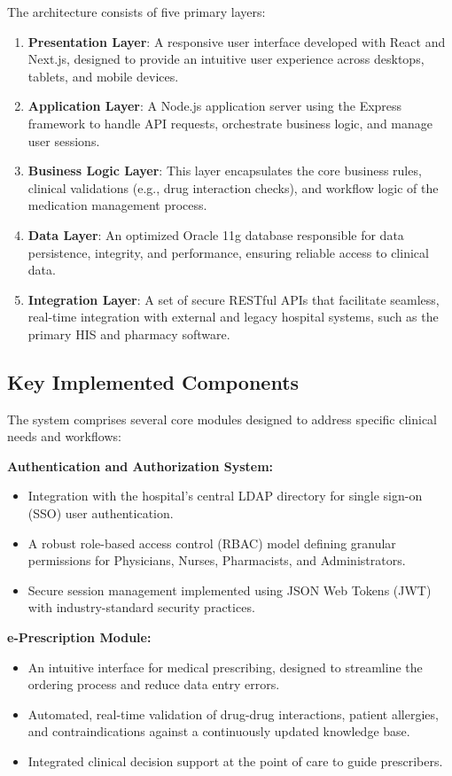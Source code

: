 The architecture consists of five primary layers:

\begin{enumerate}
    \item \textbf{Presentation Layer}: A responsive user interface developed with React and Next.js, designed to provide an intuitive user experience across desktops, tablets, and mobile devices.
    \item \textbf{Application Layer}: A Node.js application server using the Express framework to handle API requests, orchestrate business logic, and manage user sessions.
    \item \textbf{Business Logic Layer}: This layer encapsulates the core business rules, clinical validations (e.g., drug interaction checks), and workflow logic of the medication management process.
    \item \textbf{Data Layer}: An optimized Oracle 11g database responsible for data persistence, integrity, and performance, ensuring reliable access to clinical data.
    \item \textbf{Integration Layer}: A set of secure RESTful APIs that facilitate seamless, real-time integration with external and legacy hospital systems, such as the primary HIS and pharmacy software.
\end{enumerate}

\subsection{Key Implemented Components}

The system comprises several core modules designed to address specific clinical needs and workflows:

\textbf{Authentication and Authorization System:}
\begin{itemize}
    \item Integration with the hospital's central LDAP directory for single sign-on (SSO) user authentication.
    \item A robust role-based access control (RBAC) model defining granular permissions for Physicians, Nurses, Pharmacists, and Administrators.
    \item Secure session management implemented using JSON Web Tokens (JWT) with industry-standard security practices.
\end{itemize}

\textbf{e-Prescription Module:}
\begin{itemize}
    \item An intuitive interface for medical prescribing, designed to streamline the ordering process and reduce data entry errors.
    \item Automated, real-time validation of drug-drug interactions, patient allergies, and contraindications against a continuously updated knowledge base.
    \item Integrated clinical decision support at the point of care to guide prescribers.
\end{itemize}

